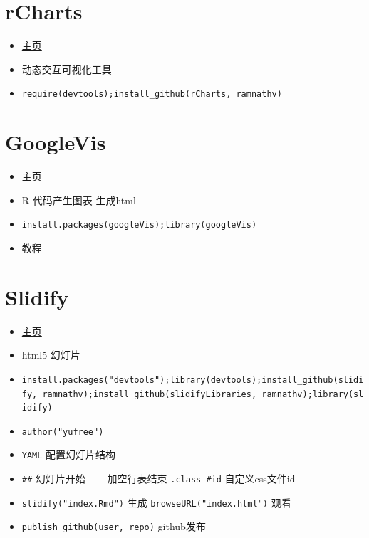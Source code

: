 \documentclass[]{book}
\providecommand{\tightlist}{%
  \setlength{\itemsep}{0pt}\setlength{\parskip}{0pt}}
\begin{document}
\hypertarget{rcharts}{%
\section{rCharts}\label{rcharts}}

\begin{itemize}
\tightlist
\item
  \href{http://ramnathv.github.io/rCharts/}{主页}
\item
  动态交互可视化工具
\item
  \texttt{require(devtools);install\_github(\textquotesingle{}rCharts\textquotesingle{},\ \textquotesingle{}ramnathv\textquotesingle{})}
\end{itemize}

\hypertarget{googlevis}{%
\section{GoogleVis}\label{googlevis}}

\begin{itemize}
\tightlist
\item
  \href{https://developers.google.com/chart/interactive/docs/gallery}{主页}
\item
  R 代码产生图表 生成html
\item
  \texttt{install.packages(\textquotesingle{}googleVis\textquotesingle{});library(googleVis)}
\item
  \href{http://decastillo.github.io/googleVis_Tutorial/}{教程}
\end{itemize}

\hypertarget{slidify}{%
\section{Slidify}\label{slidify}}

\begin{itemize}
\tightlist
\item
  \href{slidify.org}{主页}
\item
  html5 幻灯片
\item
  \texttt{install.packages("devtools");library(devtools);install\_github(\textquotesingle{}slidify\textquotesingle{},\ \textquotesingle{}ramnathv\textquotesingle{});install\_github(\textquotesingle{}slidifyLibraries\textquotesingle{},\ \textquotesingle{}ramnathv\textquotesingle{});library(slidify)}
\item
  \texttt{author("yufree")}
\item
  \texttt{YAML} 配置幻灯片结构
\item
  \texttt{\#\#} 幻灯片开始 \texttt{-\/-\/-} 加空行表结束 \texttt{.class\ \#id} 自定义css文件id
\item
  \texttt{slidify("index.Rmd")} 生成 \texttt{browseURL("index.html")} 观看
\item
  \texttt{publish\_github(user,\ repo)} github发布
\end{itemize}
\end{document}
